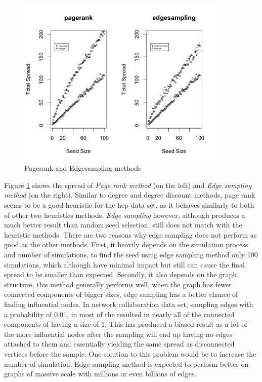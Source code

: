 \documentclass[english]{tktltiki}
\begin{document}
\begin{figure}[ht!]
\centering
\includegraphics[width=100mm]{figures/hep/page-edgesample.png}
\caption{Pagerank and Edgesampling methods}
\label{hep:pageedge}
\end{figure}
Figure \ref{hep:pageedge} shows the spread of \textit{Page rank method} (on the left) and \textit{Edge sampling method} (on the right). Similar to degree and degree discount methods, page rank seems to be a good heuristic for the hep data set, as it behaves similarly to both of other two heuristics methods. \textit{Edge sampling} however, although produces a much better result than random seed selection, still does not match with the heuristic methods. There are two reasons why edge sampling does not perform as good as the other methods. First, it heavily depends on the simulation process and number of simulations, to find the seed using edge sampling method only 100 simulations, which although have minimal impact but still can cause the final spread to be smaller than expected. Secondly, it also depends on the graph structure, this method generally performs well, when the graph has fewer connected components of bigger sizes, edge sampling has a better chance of finding influential nodes. In network collaboration data set, sampling edges with a probability of 0.01, in most of the resulted in nearly all of the connected components of having a size of 1. This has produced a biased result as a lot of the more influential nodes after the sampling will end up having no edges attached to them and essentially yielding the same spread as disconnected vertices before the sample. One solution to this problem would be to increase the number of simulation. Edge sampling method is expected to perform better on graphs of massive scale with millions or even billions of edges. 
\end{document}
